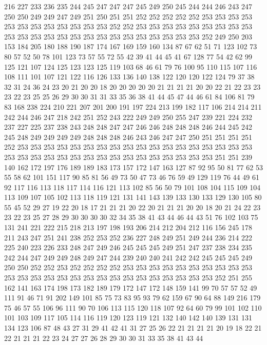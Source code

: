 216 227 233 236 235 244 245 247 247 247 245 249 250 245 244 244 246 243 247 250
250 249 249 247 249 251 250 251 251 252 252 252 252 252 253 253 253 253 253 253
253 253 253 253 253 253 252 252 253 253 253 253 253 253 253 253 253 253 253 253
253 253 253 253 253 253 253 253 253 253 253 253 252 249 250 203 153 184 205 180
188 190 187 174 167 169 159 160 134 87 67 62 51 71 123 102 73 80 57 52
50 78 101 123 73 57 55 72 55 42 39 41 44 45 41 67 128 77 54 42
62 99 125 121 107 124 125 123 123 125 119 103 68 46 61 79 76 100 95 110
115 107 116 108 111 101 107 121 122 116 126 133 136 140 138 122 120 120 122 124
79 37 38 32 31 24 36 24 23 20 21 20 20 18 20 20 20 20 20 21
21 21 21 20 20 22 21 22 23 23 23 22 23 25 25 26 29 30 30 31
31 33 35 36 38 41 44 45 47 44 46 61 84 106 81 79 83 168 238 224
210 221 207 201 200 191 197 224 213 199 182 117 106 214 214 211 242 244 246 247
218 242 251 252 243 222 249 249 250 255 247 239 221 224 232 237 227 225 237 238
243 248 248 247 247 246 246 248 248 248 246 244 245 242 245 248 249 249 249 249
248 248 248 246 243 246 247 247 250 251 251 251 251 252 253 253 253 253 253 253
253 253 253 253 253 253 253 253 253 253 253 253 253 253 253 253 253 253 253 253
253 253 253 253 253 253 253 253 251 251 239 140 162 172 197 176 189 189 183 173
157 172 147 163 127 87 92 95 50 81 77 62 53 55 58 62 101 151 117 90
85 81 56 49 73 50 47 73 46 76 59 49 129 119 76 44 49 61 92 117
116 113 118 117 114 116 121 113 102 85 56 50 79 101 108 104 115 109 104 113
109 107 105 102 113 118 119 121 131 141 143 139 133 130 133 129 130 105 80 55
45 52 29 27 19 22 20 18 17 21 21 21 20 22 20 21 21 21 20 20
18 20 21 24 22 23 23 22 23 25 27 28 29 30 30 30 30 32 34 35
38 41 43 44 46 44 43 51 76 102 103 75 131 241 221 222 215 218 213 197
198 193 206 214 212 204 212 116 156 245 178 211 243 247 251 241 238 252 253 252
236 227 248 249 251 249 244 236 214 222 225 240 223 226 233 248 247 249 246 245
245 245 249 251 247 237 238 234 235 242 244 247 249 249 248 249 247 244 239 240
240 241 242 242 245 245 245 249 250 250 252 252 253 252 252 252 252 253 253 253
253 253 253 253 253 253 253 253 253 253 253 253 253 253 253 253 253 253 253 253
253 253 253 252 251 255 162 141 163 174 198 173 182 189 179 172 147 172 148 159
141 99 70 57 57 52 49 111 91 46 71 91 202 149 101 85 75 73 83 95
93 79 62 159 67 90 64 88 149 216 179 75 46 57 55 106 96 111 90 70
106 113 115 120 118 107 92 64 60 79 99 101 102 110 101 103 109 117 105 114
116 119 120 123 119 121 132 140 142 140 139 131 131 134 123 106 87 48 43 27
31 29 41 42 41 31 27 25 26 22 21 21 21 21 20 19 18 22 21 22
21 21 21 22 23 24 27 27 26 28 29 30 30 31 33 35 38 41 43 44

